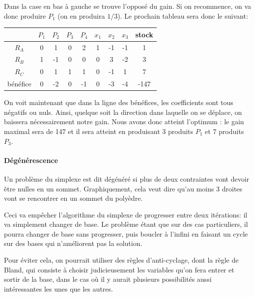       Dans la case en bas à gauche se trouve l'opposé du gain. Si on
      recommence, on va donc produire $P_1$ (on en produira $1/3$). Le prochain
      tableau sera donc le suivant:

      \begin{center}
        \begin{tabular}{|c|ccccccc|c|}\hline
          & $P_1$ & $P_2$ & $P_3$ & $P_4$ & $x_1$ & $x_2$ & $x_3$ & stock \\ \hline
          $R_A$ & 0 & 1 & 0 & 2 & 1 & -1 & -1 & 1 \\
          $R_B$ & 1 & -1 & 0 & 0 & 0 & 3 & -2 & 3 \\
          $R_C$ & 0 & 1 & 1 & 1 & 0 & -1 & 1 & 7 \\ \hline
          bénéfice & 0 & -2 & 0 & -1 & 0 & -3 & -4 & -147 \\ \hline
        \end{tabular}
      \end{center}

      On voit maintenant que dans la ligne des bénéfices, les coefficients sont
      tous négatifs ou nuls. Ainsi, quelque soit la direction dans laquelle on
      se déplace, on baissera nécessairement notre gain. Nous avons donc
      atteint l'optimum : le gain maximal sera de 147 et il sera atteint en
      produisant 3 produits $P_1$ et 7 produits $P_3$.



    \paragraph{Dégénérescence}
      Un problème du simplexe est dit dégénéré si plus de deux contraintes vont
      devoir être nulles en un sommet. Graphiquement, cela veut dire
      qu'au moins 3 droites vont se rencontrer en un sommet du polyèdre.

      Ceci va empêcher l'algorithme du simplexe de progresser entre deux
      itérations: il va simplement changer de base. Le problème étant que sur
      des cas particuliers, il pourra changer de base sans progresser, puis
      boucler à l'infini en faisant un cycle sur des bases qui n'améliorent pas
      la solution.

      Pour éviter cela, on pourrait utiliser des règles d'anti-cyclage, dont la
      règle de Bland, qui consiste à choisir judicieusement les variables qu'on
      fera entrer et sortir de la base, dans le cas où il y aurait plusieurs
      possibilités aussi intéressantes les unes que les autres.

